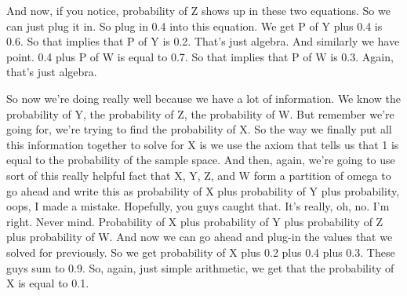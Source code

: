 \documentclass[pdftex, brazil, 12pt, twoside]{article}
\begin{document}
And now, if you notice, probability of Z shows up in
these two equations.
So we can just plug it in.
So plug in 0.4 into this equation.
We get P of Y plus 0.4 is 0.6.
So that implies that P of Y is 0.2.
That's just algebra.
And similarly we have point.
0.4 plus P of W is equal to 0.7.
So that implies that P of W is 0.3.
Again, that's just algebra.

\begin{figure}[H]
  \begin{center}
  \end{center}
\end{figure}

So now we're doing really well because we have a lot of
information.
We know the probability of Y, the probability of Z, the
probability of W. But remember we're going for, we're trying
to find the probability of X. So the way we finally put all
this information together to solve for X is we use the
axiom that tells us that 1 is equal to the probability of
the sample space.
And then, again, we're going to use sort of this really
helpful fact that X, Y, Z, and W form a partition of omega to
go ahead and write this as probability of X plus
probability of Y plus probability,
oops, I made a mistake.
Hopefully, you guys caught that.
It's really, oh, no.
I'm right.
Never mind.
Probability of X plus probability of Y plus
probability of Z plus probability of W. And now we
can go ahead and plug-in the values that we solved for
previously.
So we get probability of X plus 0.2 plus 0.4 plus 0.3.
These guys sum to 0.9.
So, again, just simple arithmetic, we get that the
probability of X is equal to 0.1.

\begin{figure}[H]
  \begin{center}
  \end{center}
\end{figure}
\end{document}
